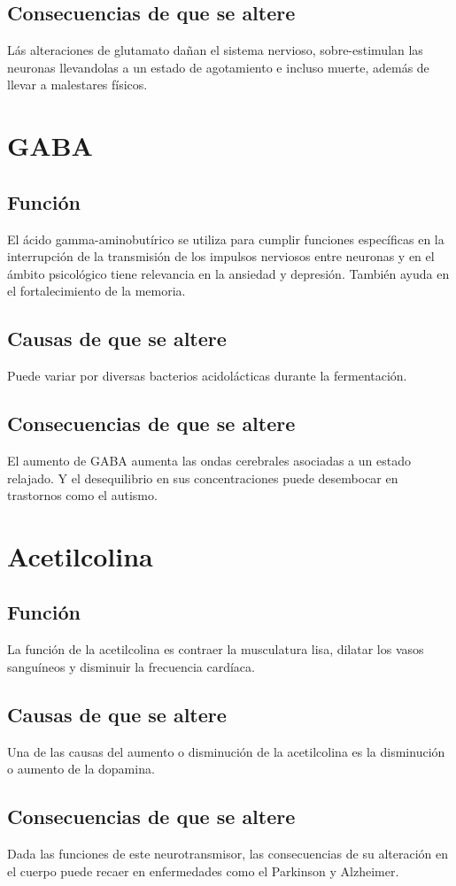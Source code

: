 \begin{multicols}{2}
\subsection*{Consecuencias de que se altere}
Lás alteraciones de glutamato dañan el sistema nervioso, sobre-estimulan las neuronas llevandolas a un estado de agotamiento e incluso muerte, además de llevar a malestares físicos.




\section*{GABA}
\subsection*{Función}
El ácido gamma-aminobutírico se utiliza para cumplir funciones específicas en la interrupción de la transmisión de los impulsos nerviosos entre neuronas y en el ámbito psicológico tiene relevancia en la ansiedad y depresión. También ayuda en el fortalecimiento de la memoria.
\subsection*{Causas de que se altere}
Puede variar por diversas bacterios acidolácticas durante la fermentación.
\subsection*{Consecuencias de que se altere}
El aumento de GABA aumenta las ondas cerebrales asociadas a un estado relajado. Y el desequilibrio en sus concentraciones puede desembocar en trastornos como el autismo.



\section*{Acetilcolina}
\subsection*{Función}
La función de la acetilcolina es contraer la musculatura lisa, dilatar los vasos sanguíneos y disminuir la frecuencia cardíaca.
\subsection*{Causas de que se altere}
Una de las causas del aumento o disminución de la acetilcolina es la disminución o aumento de la dopamina.
\subsection*{Consecuencias de que se altere}
Dada las funciones de este neurotransmisor, las consecuencias de su alteración en el cuerpo puede recaer en enfermedades como el Parkinson y Alzheimer.






\end{multicols}











